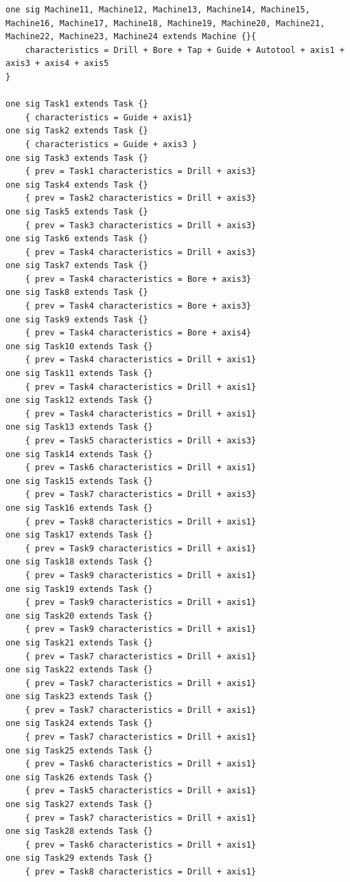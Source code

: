 \begin{lstlisting}
one sig Machine11, Machine12, Machine13, Machine14, Machine15, Machine16, Machine17, Machine18, Machine19, Machine20, Machine21, Machine22, Machine23, Machine24 extends Machine {}{
	characteristics = Drill + Bore + Tap + Guide + Autotool + axis1 + axis3 + axis4 + axis5
}

one sig Task1 extends Task {} 
	{ characteristics = Guide + axis1}
one sig Task2 extends Task {} 
	{ characteristics = Guide + axis3 }
one sig Task3 extends Task {} 
	{ prev = Task1 characteristics = Drill + axis3}
one sig Task4 extends Task {} 
	{ prev = Task2 characteristics = Drill + axis3}
one sig Task5 extends Task {} 
	{ prev = Task3 characteristics = Drill + axis3}
one sig Task6 extends Task {} 
	{ prev = Task4 characteristics = Drill + axis3}
one sig Task7 extends Task {} 
	{ prev = Task4 characteristics = Bore + axis3}
one sig Task8 extends Task {} 
	{ prev = Task4 characteristics = Bore + axis3}
one sig Task9 extends Task {} 
	{ prev = Task4 characteristics = Bore + axis4}
one sig Task10 extends Task {} 
	{ prev = Task4 characteristics = Drill + axis1}
one sig Task11 extends Task {} 
	{ prev = Task4 characteristics = Drill + axis1}
one sig Task12 extends Task {} 
	{ prev = Task4 characteristics = Drill + axis1}
one sig Task13 extends Task {} 
	{ prev = Task5 characteristics = Drill + axis3}
one sig Task14 extends Task {} 
	{ prev = Task6 characteristics = Drill + axis1}
one sig Task15 extends Task {} 
	{ prev = Task7 characteristics = Drill + axis3}
one sig Task16 extends Task {} 
	{ prev = Task8 characteristics = Drill + axis1}
one sig Task17 extends Task {} 
	{ prev = Task9 characteristics = Drill + axis1}
one sig Task18 extends Task {} 
	{ prev = Task9 characteristics = Drill + axis1}
one sig Task19 extends Task {} 
	{ prev = Task9 characteristics = Drill + axis1}
one sig Task20 extends Task {} 
	{ prev = Task9 characteristics = Drill + axis1}
one sig Task21 extends Task {} 
	{ prev = Task7 characteristics = Drill + axis1}
one sig Task22 extends Task {} 
	{ prev = Task7 characteristics = Drill + axis1}
one sig Task23 extends Task {} 
	{ prev = Task7 characteristics = Drill + axis1}
one sig Task24 extends Task {} 
	{ prev = Task7 characteristics = Drill + axis1}
one sig Task25 extends Task {} 
	{ prev = Task6 characteristics = Drill + axis1}
one sig Task26 extends Task {} 
	{ prev = Task5 characteristics = Drill + axis1}
one sig Task27 extends Task {} 
	{ prev = Task7 characteristics = Drill + axis1}
one sig Task28 extends Task {} 
	{ prev = Task6 characteristics = Drill + axis1}
one sig Task29 extends Task {} 
	{ prev = Task8 characteristics = Drill + axis1}

\end{lstlisting}

